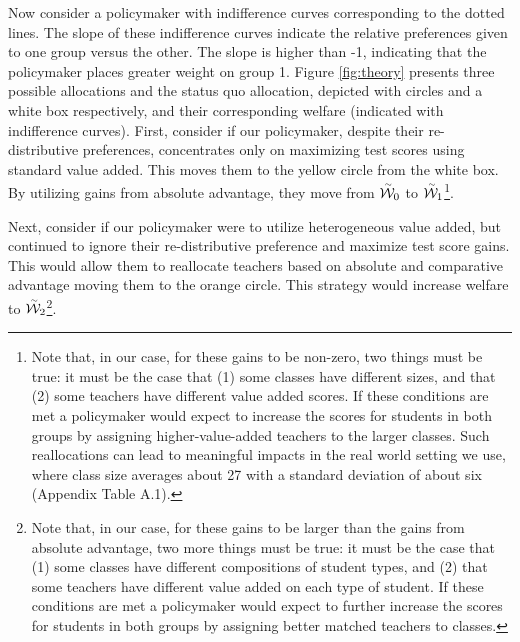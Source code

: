 \documentclass[12pt]{article}
\theoremstyle{definition}
\theoremstyle{definition}
\theoremstyle{definition}
\theoremstyle{definition}
\begin{document}
Now consider a policymaker with indifference curves corresponding to the dotted lines. The slope of these indifference curves indicate the relative preferences given to one group versus the other. The slope is higher than -1, indicating that the policymaker places greater weight on group 1. Figure \ref{fig:theory} presents three possible allocations and the status quo allocation, depicted with circles and a white box respectively, and their corresponding welfare (indicated with indifference curves). First, consider if our policymaker, despite their re-distributive preferences, concentrates only on maximizing test scores using standard value added. This moves them to the yellow circle from the white box. By utilizing gains from absolute advantage, they move from $\accentset{\sim}{\mathcal{W}}_0$ to $\accentset{\sim}{\mathcal{W}}_1$\footnote{Note that, in our case, for these gains to be non-zero, two things must be true: it must be the case that (1) some classes have different sizes, and that (2) some teachers have different value added scores. If these conditions are met a policymaker would expect to increase the scores for students in both groups by assigning higher-value-added teachers to the larger classes. Such reallocations can lead to meaningful impacts in the real world setting we use, where class size averages about 27 with a standard deviation of about six (Appendix Table A.1).}.

Next, consider if our policymaker were to utilize heterogeneous value added, but continued to ignore their re-distributive preference and maximize test score gains. This would allow them to reallocate teachers  based on absolute and comparative advantage moving them to the orange circle. This strategy would increase welfare to $\accentset{\sim}{\mathcal{W}}_2$\footnote{Note that, in our case, for these gains to be larger than the gains from absolute advantage, two more things must be true: it must be the case that (1) some classes have different compositions of student types, and (2) that some teachers have different value added on each type of student. If these conditions are met a policymaker would expect to further increase the scores for students in both groups by assigning better matched teachers to classes.}.
\end{document}
